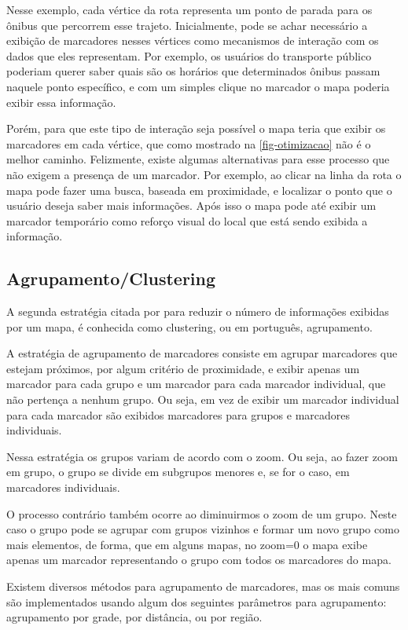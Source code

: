 	Nesse exemplo, cada vértice da rota representa um ponto de parada para os ônibus que percorrem esse trajeto. Inicialmente, pode se achar necessário a exibição de marcadores nesses vértices como mecanismos de interação com os dados que eles representam. Por exemplo, os usuários do transporte público poderiam querer saber quais são os horários que determinados ônibus passam naquele ponto específico, e com um simples clique no marcador o mapa poderia exibir essa informação. 
	
	Porém, para que este tipo de interação seja possível o mapa teria que exibir os marcadores em cada vértice, que como mostrado na \autoref{fig-otimizacao} não é o melhor caminho. Felizmente, existe algumas alternativas para esse processo que não exigem a presença de um marcador. Por exemplo, ao clicar na linha da rota o mapa pode fazer uma busca, baseada em proximidade, e localizar o ponto que o usuário deseja saber mais informações. Após isso o mapa pode até exibir um marcador temporário como reforço visual do local que está sendo exibida a informação.
	

  \subsection{Agrupamento/Clustering\label{secagrupamento}}
  A segunda estratégia citada por \cite[capítulo~9]{livroGoogleApiV3} para reduzir o número de informações exibidas por um mapa, é conhecida como clustering, ou em português, agrupamento.
  
  A estratégia de agrupamento de marcadores consiste em agrupar marcadores que estejam próximos, por algum critério de proximidade, e exibir apenas um marcador para cada grupo e um marcador para cada marcador individual, que não pertença a nenhum grupo. Ou seja, em vez de exibir um marcador individual para cada marcador são exibidos marcadores para grupos e marcadores individuais. 
  
  Nessa estratégia os grupos variam de acordo com o zoom. Ou seja, ao fazer zoom em grupo, o grupo se divide em subgrupos menores e, se for o caso, em marcadores individuais.
  
   O processo contrário também ocorre ao diminuirmos o zoom de um grupo. Neste caso o grupo pode se agrupar com grupos vizinhos e formar um novo grupo como mais elementos, de forma, que em alguns mapas, no zoom=0 o mapa exibe apenas um marcador representando o grupo com todos os marcadores do mapa.

   Existem diversos métodos para agrupamento de marcadores, mas os mais comuns são implementados usando algum dos seguintes parâmetros para agrupamento: agrupamento por grade, por distância, ou por região.
     
